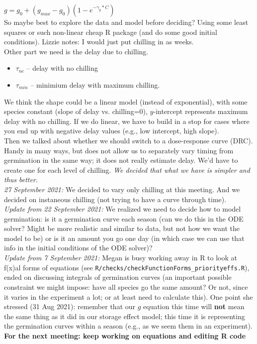 \documentclass[11pt,letter]{article}
\begin{document}
$g=g_0 + (g_{max}-g_0)(1-e^{-\gamma_g*C})$ \\

So maybe best to explore the data and model before deciding? Using some least squares or such non-linear cheap R package (and do some good initial conditions). Lizzie notes: I would just put chilling in as weeks. \\

Other part we need is the delay due to chilling. 
\begin{itemize}
\item $\tau_{nc}$ -- delay with no chilling
\item $\tau_{min}$ -- minimium delay with maximum chilling.
\end{itemize}
We think the shape could be a linear model (instead of exponential), with some species constant (slope of delay vs. chilling=0), $y$-intercept represents maximum delay with no chilling. If we do linear, we have to build in a stop for cases where you end up with negative delay values (e.g., low intercept, high slope).\\

Then we talked about whether we should switch to a dose-response curve (DRC). Handy in many ways, but does not allow us to separately vary timing from germination in the same way; it does not really estimate delay. We'd have to create one for each level of chilling. \emph{We decided that what we have is simpler and thus better.} \\

\emph{27 September 2021:} We decided to vary only chilling at this meeting. And we decided on instaneous chilling (not trying to have a curve through time).\\

\emph{Update from 22 September 2021:} We realized we need to decide how to model germination: is it a germination curve each season (can we do this in the ODE solver? Might be more realistic and similar to data, but not how we want the model to be) or is it an amount you go one day (in which case we can use that info in the initial conditions of the ODE solver)?\\

\emph{Update from 7 September 2021:} Megan is busy working away in R to look at f(x)al forms of equations (see \verb|R/checks/checkFunctionForms_priorityeffs.R|), ended on discussing integrals of germination curves (an important possible constraint we might impose: have all species go the same amount? Or not, since it varies in the experiment a lot; or at least need to calculate this). One point she stressed (31 Aug 2021): remember that our $g$ equation this time will {\bf not} mean the same thing as it did in our storage effect model; this time it is representing the germination curves within a season (e.g., as we seem them in an experiment). {\bf For the next meeting: keep working on equations and editing R code}\\
\end{document}
